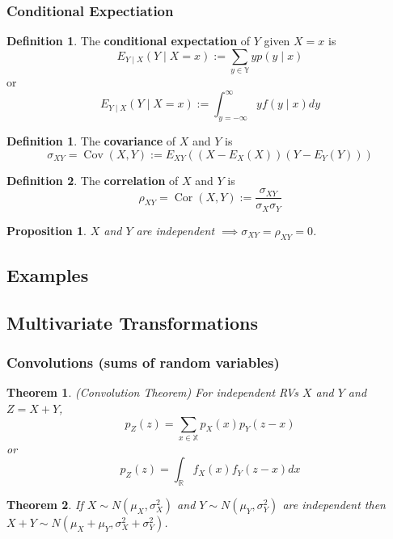 \documentclass[12pt]{article}
\newtheorem{thm}{Theorem}[section]
\newtheorem*{prop*}{Proposition}
\theoremstyle{definition}
\newtheorem{defn}{Definition}[subsection]
\newtheorem*{defn*}{Definition}
\newcommand{\R}{\mathbb{R}}
\newcommand{\X}{\mathbb{X}}
\newcommand{\Y}{\mathbb{Y}}
\DeclareMathOperator{\Cov}{Cov}
\DeclareMathOperator{\Cor}{Cor}
\begin{document}
\subsubsection{Conditional Expectiation}

\begin{defn}
  The \textbf{conditional expectation} of $Y$ given $X = x$ is
  $$E_{Y \mid X}(Y \mid X = x) := \sum_{y \in \Y}yp(y \mid x)$$
  or
  $$E_{Y \mid X}(Y \mid X = x) := \int_{y = -\infty}^{\infty}yf(y \mid x)dy$$
\end{defn}

\begin{defn*}
  The \textbf{covariance} of $X$ and $Y$ is
  $$\sigma_{XY} = \Cov(X, Y) := E_{XY}((X - E_X(X))(Y - E_Y(Y)))$$
\end{defn*}

\begin{defn}
  The \textbf{correlation} of $X$ and $Y$ is
  $$\rho_{XY} = \Cor(X, Y) := \frac{\sigma_{XY}}{\sigma_X\sigma_Y}$$
\end{defn}

\begin{prop*}
  $X$ and $Y$ are independent $\implies \sigma_{XY} = \rho_{XY} = 0$.
\end{prop*}

\subsection{Examples}

\subsection{Multivariate Transformations}

\subsubsection{Convolutions (sums of random variables)}


\begin{thm}
  (Convolution Theorem)
  For independent RVs $X$ and $Y$ and $Z = X + Y$,
  $$p_Z(z) = \sum_{x \in \X}p_X(x)p_Y(z - x)$$
  or
  $$p_Z(z) = \int_{\R}f_X(x)f_Y(z - x)dx$$
\end{thm}


\begin{thm}
  If $X \sim N(\mu_X, \sigma_X^2)$ and $Y \sim N(\mu_Y, \sigma_Y^2)$ are independent then $X + Y \sim N(\mu_X + \mu_Y, \sigma_X^2 + \sigma_Y^2)$.
\end{thm}
\end{document}
